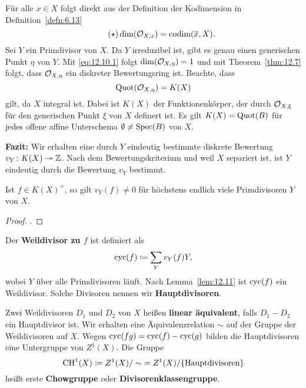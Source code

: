 \begin{bem}
\label{bem:12.10}
	Für alle $x \in X$ folgt direkt aus der Definition der Kodimension in Definition~\ref{defn:6.13}
	\[
		\label{eq:12.10.1}\tag{$\star$}
		\dim(\mathcal{O}_{X,x}) = \operatorname{codim}(\overline{x},X).
	\]
	Sei $Y$ ein Primdivisor von $X$. Da $Y$ irreduzibel ist, gibt es genau einen generischen Punkt $\eta$ von $Y$. Mit \eqref{eq:12.10.1} folgt $\dim(\mathcal{O}_{X,\eta}) = 1$ und mit Theorem~\ref{thm:12.7} folgt, dass $\mathcal{O}_{X,\eta}$ ein diskreter Bewertungsring ist. Beachte, dass 
	\[
		\operatorname{Quot}(\mathcal{O}_{X,\eta}) = K(X)
	\]
	gilt, da $X$ integral ist. Dabei ist $K(X)$ der Funktionenkörper, der durch $\mathcal{O}_{X,\xi}$ für den generischen Punkt $\xi$ von $X$ definert ist. Es gilt $K(X) = \operatorname{Quot}(B)$ für jedes offene affine Unterschema $\emptyset \ne \operatorname{Spec}(B)$ von $X$.

	\textbf{Fazit:} Wir erhalten eine durch $Y$ eindeutig bestimmte diskrete Bewertung $v_Y\colon K(X) \twoheadrightarrow \mathbb {Z}$. Nach dem Bewertungskriterium und weil $X$ separiert ist, ist $Y$ eindeutig durch die Bewertung $v_Y$ bestimmt.
\end{bem}

\begin{lem}
\label{lem:12.11}
	Ist $f \in K(X)^\times$, so gilt $v_Y(f)\ne 0$ für höchstens endlich viele Primdivisoren $Y$ von $X$.
	\begin{proof}
		\cite[Lemma~II.6.1]{hartshorne1977algebraic}.
	\end{proof}
\end{lem}

\begin{defn}
\label{defn:12.12}
	Der \textbf{Weildivisor zu $f$} ist definiert als
	\[
		\operatorname{cyc}(f)\coloneqq \sum_{Y}v_Y(f) Y,
	\]
	wobei $Y$ über alle Primdivisoren läuft. Nach Lemma~\ref{lem:12.11} ist $\operatorname{cyc}(f)$ ein Weildivisor. Solche Divisoren nennen wir \textbf{Hauptdivisoren}.
\end{defn}

\begin{defn}
\label{defn:12.13}
	Zwei Weildivisoren $D_1$ und $D_2$ von $X$ heißen \textbf{linear äquivalent}, falls $D_1-D_2$ ein Hauptdivisor ist. Wir erhalten eine Äquivalenzrelation $\sim$ auf der Gruppe der Weildivisoren auf $X$. Wegen $\operatorname{cyc}(fg) = \operatorname{cyc}(f)-\operatorname{cyc}(g)$ bilden die Hauptdivisoren eine Untergruppe von $Z^1(X)$. Die Gruppe
	\[
		\operatorname{CH}^1(X) \coloneqq Z^1(X)/\sim \; = Z^1(X)/\{\text{Hauptdivisoren}\}
	\]
	heißt erste \textbf{Chowgruppe} oder \textbf{Divisorenklassengruppe}.
\end{defn}

